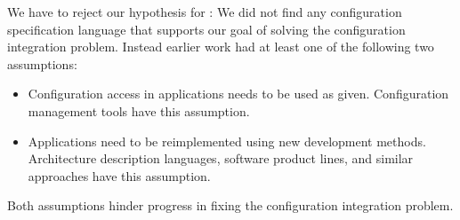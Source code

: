 \begin{finding}
We have to reject our hypothesis for :
We did not find any configuration specification language that supports our goal of solving the configuration integration problem.
Instead earlier work had at least one of the following two assumptions:
\begin{itemize}
\item Configuration access in applications needs to be used as given.
Configuration management tools have this assumption.
\item Applications need to be reimplemented using new development methods.
Architecture description languages, software product lines, and similar approaches have this assumption.
\end{itemize}
\end{finding}
\par
Both assumptions hinder progress in fixing the configuration integration problem.



\begingroup
\sloppy
\makeatletter
\g@addto@macro{\UrlBreaks}{\UrlOrds}
\makeatother

\endgroup





